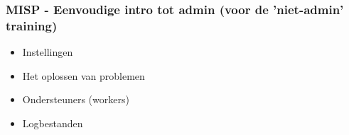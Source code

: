 \begin{frame}
    \frametitle{MISP - Eenvoudige intro tot admin (voor de 'niet-admin' training)}
    \begin{itemize}
        \item Instellingen
        \item Het oplossen van problemen
        \item Ondersteuners (workers)
        \item Logbestanden
    \end{itemize}
\end{frame}
